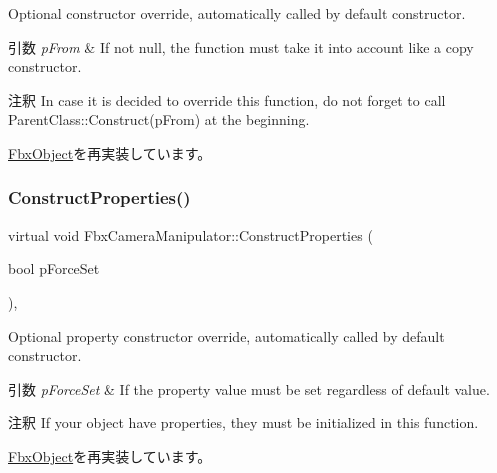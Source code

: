 Optional constructor override, automatically called by default constructor. 
\begin{DoxyParams}{引数}
{\em p\+From} & If not null, the function must take it into account like a copy constructor. \\
\hline
\end{DoxyParams}
\begin{DoxyRemark}{注釈}
In case it is decided to override this function, do not forget to call Parent\+Class\+::\+Construct(p\+From) at the beginning. 
\end{DoxyRemark}


\hyperlink{class_fbx_object_a313503bc645af3fdceb4a99ef5cea7eb}{Fbx\+Object}を再実装しています。

\mbox{\label{class_fbx_camera_manipulator_a9e97c5d7f153bbc80a2c233d425a447f}} 
\subsubsection{\texorpdfstring{Construct\+Properties()}{ConstructProperties()}}
{\footnotesize\ttfamily virtual void Fbx\+Camera\+Manipulator\+::\+Construct\+Properties (\begin{DoxyParamCaption}\item[{bool}]{p\+Force\+Set }\end{DoxyParamCaption})\hspace{0.3cm}{\ttfamily [protected]}, {\ttfamily [virtual]}}

Optional property constructor override, automatically called by default constructor. 
\begin{DoxyParams}{引数}
{\em p\+Force\+Set} & If the property value must be set regardless of default value. \\
\hline
\end{DoxyParams}
\begin{DoxyRemark}{注釈}
If your object have properties, they must be initialized in this function. 
\end{DoxyRemark}


\hyperlink{class_fbx_object_ad44f814323dc1b5e78bff1bfc608b4bb}{Fbx\+Object}を再実装しています。

\mbox{\label{class_fbx_camera_manipulator_aba0217b5fd302152dc0e2726ca3c325a}} 
